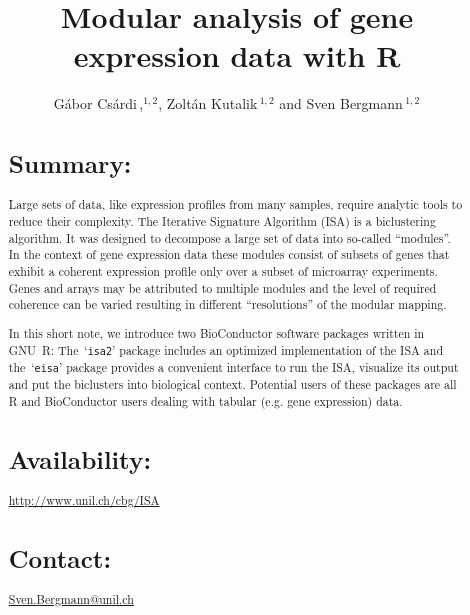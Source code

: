 \documentclass{bioinfo}
\newcommand{\Rpackage}[1]{`\texttt{#1}'}
\begin{document}

\title[Modular analysis]{Modular analysis of gene expression data with R}
\author[G\'abor Cs\'ardi \textit{et~al}]{G\'abor Cs\'ardi\,,$^{1,2}$,
  Zolt\'an Kutalik\,$^{1,2}$ and Sven Bergmann\,$^{1,2}$}
\address{$^{1}$Department of Medical Genetics, and
  $^{2}$Swiss Institute of Bioinformatics,
  University of Lausanne, Rue de Bugnon 27, CH-1005 Lausanne,
  Switzerland.}



\maketitle

\begin{abstract}
\section{Summary:}
Large sets of data, like expression profiles from many samples, require
analytic tools to reduce their complexity. The Iterative Signature
Algorithm (ISA) is a biclustering algorithm. 
It was designed to decompose a large set of data into so-called
``modules''. In the context of gene expression data these modules consist of
subsets of genes that exhibit a coherent expression profile only over a
subset of microarray experiments. Genes and arrays may be attributed to
multiple modules and the level of required coherence can be varied resulting
in different ``resolutions'' of the modular mapping. 

In this short note, we introduce two BioConductor \citep{BioC} software
packages written in GNU~R: The~\Rpackage{isa2} package includes an optimized
implementation of the ISA and the~\Rpackage{eisa} package provides a
convenient interface 
to run the ISA, visualize its output and put the biclusters into
biological context. Potential users of these packages are all R and
BioConductor users dealing with tabular (e.g. gene expression) data.

\section{Availability:}
\href{http://www.unil.ch/cbg/ISA}%
{\url{http://www.unil.ch/cbg/ISA}}
\section{Contact:} \href{Sven.Bergmann@unil.ch}{Sven.Bergmann@unil.ch}
\end{abstract}
\end{document}
